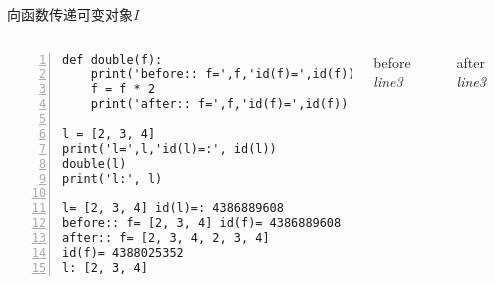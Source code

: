 \documentclass{beamer}
\begin{document}
\begin{frame}[fragile]{向函数传递可变对象\textit{I}}
\begin{columns}
\begin{Verbatim}[numbers=left,frame=single,rulecolor=\color{red}]
def double(f):
    print('before:: f=',f,'id(f)=',id(f))
    f = f * 2
    print('after:: f=',f,'id(f)=',id(f))

l = [2, 3, 4]
print('l=',l,'id(l)=:', id(l))
double(l)
print('l:', l)

l= [2, 3, 4] id(l)=: 4386889608
before:: f= [2, 3, 4] id(f)= 4386889608
after:: f= [2, 3, 4, 2, 3, 4] 
id(f)= 4388025352
l: [2, 3, 4]
\end{Verbatim}
\begin{block}{before \textit{line3}}
\end{block}
\begin{block}{after \textit{line3}}
\end{block}

\end{columns}
\end{frame}
\end{document}
